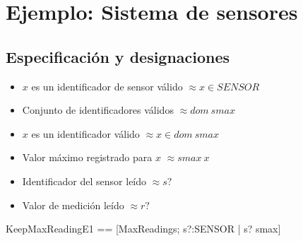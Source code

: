 \section*{Ejemplo: Sistema de sensores}

\subsection*{Especificación y designaciones}

\begin{itemize}
  \item $x$ es un identificador de sensor válido $\approx x \in SENSOR$
\end{itemize}

\begin{zed}
[SENSOR]
\end{zed}

\begin{itemize}
  \item Conjunto de identificadores válidos $\approx dom~smax$ \\
  \item $x$ es un identificador válido $\approx x \in dom~smax$ \\
  \item Valor máximo registrado para $x$ $\approx smax~x$ 
\end{itemize}


\begin{itemize}
  \item Identificador del sensor leído $\approx s?$ \\
  \item Valor de medición leído $\approx r?$ 
\end{itemize}


\begin{zed}
KeepMaxReadingE1 == [\Xi MaxReadings; s?:SENSOR | s? \notin \dom smax]
\end{zed}

